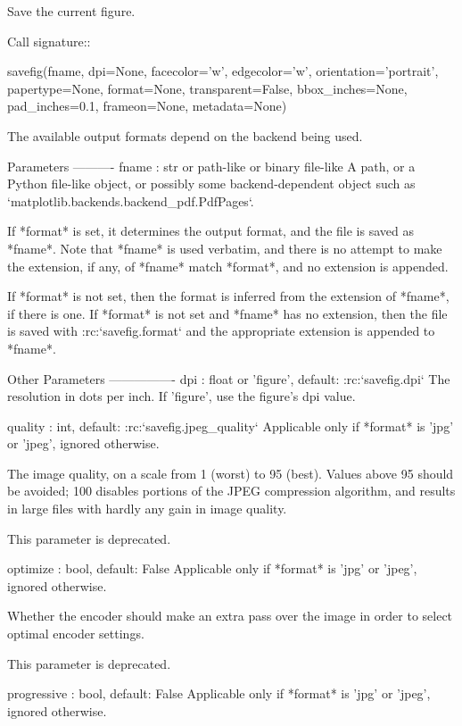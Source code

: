 \begin{DoxyVerb}Save the current figure.

Call signature::

  savefig(fname, dpi=None, facecolor='w', edgecolor='w',
  orientation='portrait', papertype=None, format=None,
  transparent=False, bbox_inches=None, pad_inches=0.1,
  frameon=None, metadata=None)

The available output formats depend on the backend being used.

Parameters
----------
fname : str or path-like or binary file-like
    A path, or a Python file-like object, or
    possibly some backend-dependent object such as
    `matplotlib.backends.backend_pdf.PdfPages`.

    If *format* is set, it determines the output format, and the file
    is saved as *fname*.  Note that *fname* is used verbatim, and there
    is no attempt to make the extension, if any, of *fname* match
    *format*, and no extension is appended.

    If *format* is not set, then the format is inferred from the
    extension of *fname*, if there is one.  If *format* is not
    set and *fname* has no extension, then the file is saved with
    :rc:`savefig.format` and the appropriate extension is appended to
    *fname*.

Other Parameters
----------------
dpi : float or 'figure', default: :rc:`savefig.dpi`
    The resolution in dots per inch.  If 'figure', use the figure's
    dpi value.

quality : int, default: :rc:`savefig.jpeg_quality`
    Applicable only if *format* is 'jpg' or 'jpeg', ignored otherwise.

    The image quality, on a scale from 1 (worst) to 95 (best).
    Values above 95 should be avoided; 100 disables portions of
    the JPEG compression algorithm, and results in large files
    with hardly any gain in image quality.

    This parameter is deprecated.

optimize : bool, default: False
    Applicable only if *format* is 'jpg' or 'jpeg', ignored otherwise.

    Whether the encoder should make an extra pass over the image
    in order to select optimal encoder settings.

    This parameter is deprecated.

progressive : bool, default: False
    Applicable only if *format* is 'jpg' or 'jpeg', ignored otherwise.


\end{DoxyVerb}
